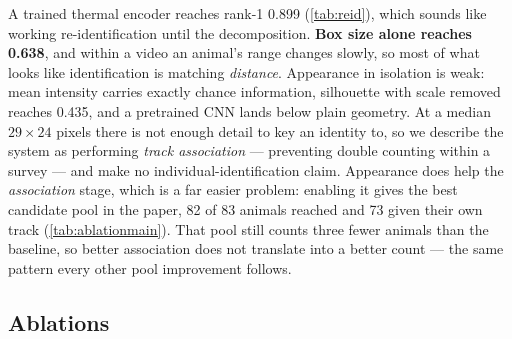 A trained thermal encoder reaches rank-1 0.899 (\cref{tab:reid}), which sounds like working
re-identification until the decomposition. \textbf{Box size alone reaches 0.638}, and within
a video an animal's range changes slowly, so most of what looks like identification is
matching \emph{distance}. Appearance in isolation is weak: mean intensity carries exactly
chance information, silhouette with scale removed reaches 0.435, and a pretrained CNN lands
below plain geometry. At a median $29\times24$ pixels there is not enough detail to key an
identity to, so we describe the system as performing \emph{track association} --- preventing
double counting within a survey --- and make no individual-identification claim. Appearance does help the
\emph{association} stage, which is a far easier problem: enabling it gives the best candidate
pool in the paper, 82 of 83 animals reached and 73 given their own track
(\cref{tab:ablationmain}). That pool still counts three fewer animals than the baseline,
so better association does not translate into a better count --- the same pattern every other
pool improvement follows.

\subsection{Ablations}


